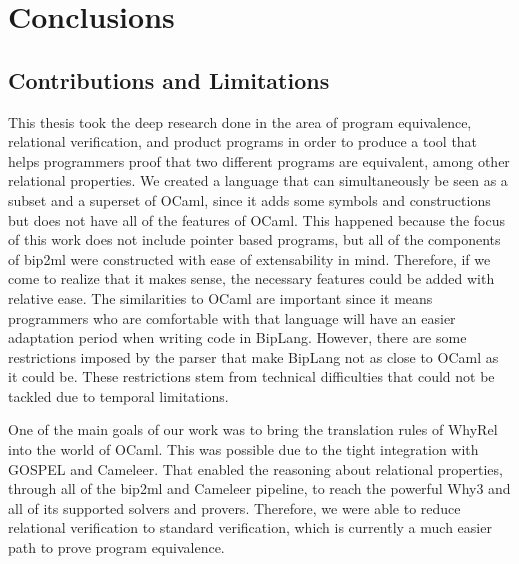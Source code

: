 
%

\chapter{Conclusions}
\label{cha:conclusion}

\section{Contributions and Limitations}
\label{sec:contributions_limitations}

This thesis took the deep research done in the area of program equivalence, relational verification, and product programs in order to produce a tool that helps programmers proof that two different programs are equivalent, among other relational properties.
We created a language that can simultaneously be seen as a subset and a superset of OCaml, since it adds some symbols and constructions but does not have all of the features of OCaml.
This happened because the focus of this work does not include pointer based programs, but all of the components of bip2ml were constructed with ease of extensability in mind. 
Therefore, if we come to realize that it makes sense, the necessary features could be added with relative ease.
The similarities to OCaml are important since it means programmers who are comfortable with that language will have an easier adaptation period when writing code in BipLang.
However, there are some restrictions imposed by the parser that make BipLang not as close to OCaml as it could be.
These restrictions stem from technical difficulties that could not be tackled due to temporal limitations.

One of the main goals of our work was to bring the translation rules of WhyRel into the world of OCaml.
This was possible due to the tight integration with GOSPEL and Cameleer.
That enabled the reasoning about relational properties, through all of the bip2ml and Cameleer pipeline, to reach the powerful Why3 and all of its supported solvers and provers.
Therefore, we were able to reduce relational verification to standard verification, which is currently a much easier path to prove program equivalence.


